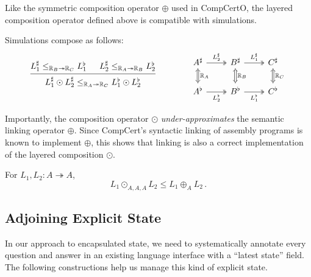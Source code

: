 \documentclass[acmsmall,screen,review,anonymous]{acmart}
\begin{document}
Like the symmetric composition operator $\oplus$ used in CompCertO,
the layered composition operator defined above
is compatible with simulations.

\begin{theorem} \label{thm:lcompsim}
Simulations compose as follows:
\[
  \begin{prooftree}
    \hypo{L_1^\sharp
          \le_{\mathbb{R}_B \twoheadrightarrow \mathbb{R}_C}
          L_1^\flat}
    \hypo{L_2^\sharp
          \le_{\mathbb{R}_A \twoheadrightarrow \mathbb{R}_B}
          L_2^\flat}
    \infer2{L_1^\sharp \odot L_2^\sharp
          \le_{\mathbb{R}_A \twoheadrightarrow \mathbb{R}_C}
          L_1^\flat \odot L_2^\flat}
  \end{prooftree}
  \qquad \qquad
  \begin{tikzcd}
    A^\sharp \ar[r, twoheadrightarrow, "L_2^\sharp"]
             \ar[d, Leftrightarrow, "\mathbb{R}_A"] &
    B^\sharp \ar[r, twoheadrightarrow, "L_1^\sharp"]
             \ar[d, Leftrightarrow, "\mathbb{R}_B"] &
    C^\sharp \ar[d, Leftrightarrow, "\mathbb{R}_C"]
    \\
    A^\flat \ar[r, twoheadrightarrow, "L_2^\flat"'] &
    B^\flat \ar[r, twoheadrightarrow, "L_1^\flat"'] &
    C^\flat
  \end{tikzcd}
\]
\end{theorem}

Importantly,
the composition operator $\odot$
\emph{under-approximates}
the semantic linking operator $\oplus$.
Since CompCert's syntactic linking of assembly programs
is known to implement $\oplus$,
this shows that linking is also a correct implementation of
the layered composition $\odot$.

\begin{theorem}
For $L_1, L_2 : A \twoheadrightarrow A$,
\[
  L_1 \odot_{A,A,A} L_2
  \le
  L_1 \oplus_A L_2
 \,.
\]
\end{theorem}


\subsection{Adjoining Explicit State} \label{sec:basic:state} %

In our approach to encapsulated state,
we need to systematically
annotate every question and answer
in an existing language interface
with a ``latest state'' field.
The following constructions help us manage
this kind of explicit state.
\end{document}
